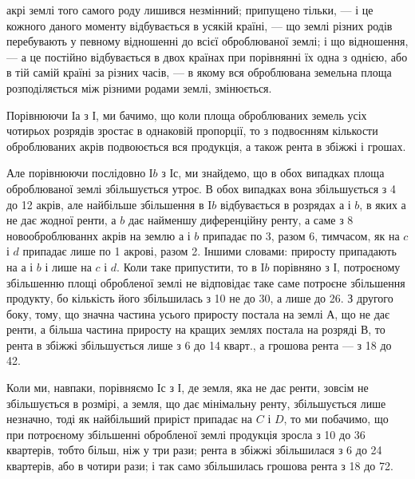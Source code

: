 \parcont{}  %
акрі землі того самого роду лишився незмінний; припущено тільки, — і це кожного
даного моменту відбувається в усякій країні, — що землі різних родів перебувають
у певному відношенні до всієї оброблюваної землі; і що відношення, — а це постійно
відбувається в двох країнах при порівнянні їх одна з однією, або в тій самій
країні за різних часів, — в якому вся оброблювана земельна площа розподіляється
між різними родами землі, змінюється.

Порівнюючи І$а$ з І, ми бачимо, що коли площа оброблюваних земель усіх
чотирьох розрядів зростає в однаковій пропорції, то з подвоєнням кількости
оброблюваних акрів подвоюється вся продукція, а також рента в збіжжі і грошах.

Але порівнюючи послідовно І$b$ з І$с$, ми знайдемо, що в обох випадках площа
оброблюваної землі збільшується утроє. В обох випадках вона збільшується з
4 до 12 акрів, але найбільше збільшення в I$b$ відбувається в розрядах
$а$ і $b$, в яких $а$ не дає жодної ренти, а $b$ дає найменшу
диференційну ренту, а саме з 8 новооброблюваннх акрів на землю $а$ і $b$
припадає по 3, разом 6, тимчасом,
як на $c$ і $d$ припадає лише по 1 акрові, разом 2. Іншими словами:  приросту
припадають на $а$ і $b$ і лише  на $c$ і $d$. Коли таке припустити, то в
I$b$ порівняно з І, потроєному збільшенню площі обробленої землі не відповідає
таке саме потроєне збільшення продукту, бо кількість його збільшилась з 10
не до 30, а лише до 26. З другого боку, тому, що значна частина усього приросту
постала на землі $А$, що не дає ренти, а більша частина приросту на
кращих землях постала на розряді $В$, то рента в збіжжі збільшується лише
з 6 до 14 кварт., а грошова рента — з 18 до 42.

Коли ми, навпаки, порівняємо І$с$ з І, де земля, яка не дає ренти, зовсім
не збільшується в розмірі, а земля, що дає мінімальну ренту, збільшується
лише незначно, тоді як найбільший приріст припадає на $C$ і $D$, то ми побачимо,
що при потроєному збільшенні обробленої землі продукція зросла з 10 до
36 квартерів, тобто більш, ніж у три рази; рента в збіжжі збільшилася з 6 до
24 квартерів, або в чотири рази; і так само збільшилась грошова рента
з 18 до 72.

